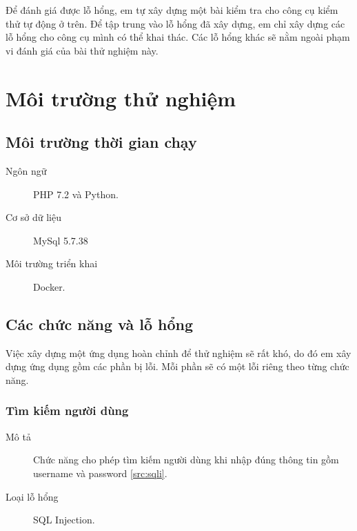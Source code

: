 \documentclass[./../main.tex]{subfiles}
\begin{document}

Để đánh giá được lỗ hổng, em tự xây dựng một bài kiểm tra cho công cụ kiểm
thử tự động ở trên. Để tập trung vào lỗ hổng đã xây dựng, em chỉ xây dựng
các lỗ hổng cho công cụ mình có thể khai thác. Các lỗ hổng khác sẽ nằm
ngoài phạm vi đánh giá của bài thử nghiệm này.

\section{Môi trường thử nghiệm}

\subsection{Môi trường thời gian chạy}

\begin{description}
	\item[Ngôn ngữ] PHP 7.2 và Python.
	\item [Cơ sở dữ liệu] MySql 5.7.38
	\item [Môi trường triển khai] Docker.
\end{description}

\subsection{Các chức năng và lỗ hổng}

Việc xây dựng một ứng dụng hoàn chỉnh để thử nghiệm sẽ rất khó,
do đó em xây dựng ứng dụng gồm các phần bị lỗi. Mỗi phần sẽ có một lỗi riêng
theo từng chức năng.

\subsubsection{Tìm kiếm người dùng}

\begin{description}
	\item[Mô tả] Chức năng cho phép tìm kiếm người dùng khi nhập đúng
	      thông tin gồm username và password \ref{src:sqli}.
	\item [Loại lỗ hổng] SQL Injection.
\end{description}
\end{document}
